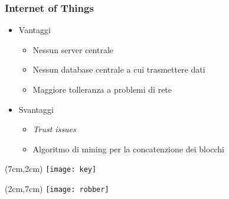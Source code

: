 \begin{frame}
 \frametitle{Internet of Things}

 \begin{itemize}
  \item<1-> Vantaggi
  \begin{itemize}
   \item Nessun server centrale
   \item Nessun database centrale a cui trasmettere dati
   \item Maggiore tolleranza a problemi di rete
  \end{itemize}

  \item<2-> Svantaggi
  \begin{itemize}
   \item \textit{Trust issues}
   \item Algoritmo di mining per la concatenzione dei blocchi
  \end{itemize}

 \end{itemize}


 \begin{textblock*}{5cm}(7cm,2cm)
  \texttt{[image: key]}
 \end{textblock*}


 \begin{textblock*}{5cm}(2cm,7cm)
  \texttt{[image: robber]}
 \end{textblock*}

\end{frame}
